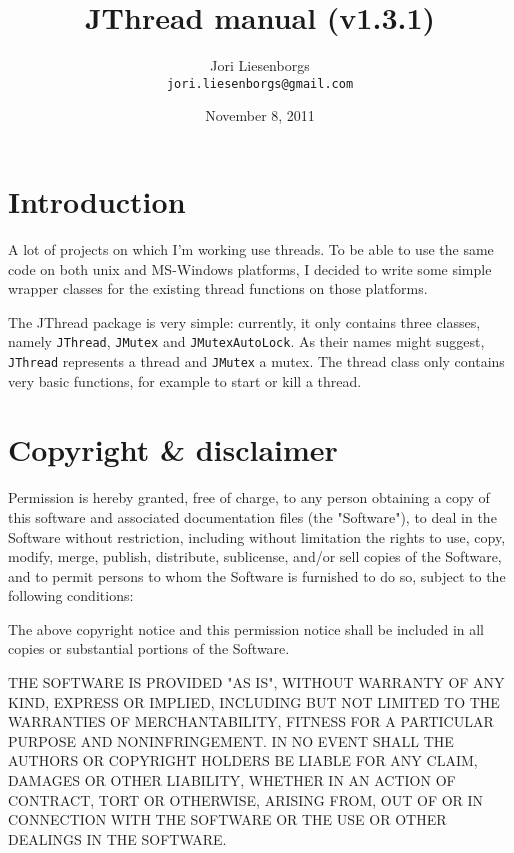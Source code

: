 \documentclass[a4paper,12pt]{article}
\begin{document}
	\title{JThread manual (v1.3.1)}
	\author{Jori Liesenborgs\\
	        {\tt jori.liesenborgs@gmail.com} }
	\date{November 8, 2011}
	\maketitle

	\section{Introduction}

	A lot of projects on which I'm working use threads. To be able to
	use the same code on both unix and MS-Windows platforms, I decided
	to write some simple wrapper classes for the existing thread functions
	on those platforms.

	The JThread package is very simple: currently, it only contains three
	classes, namely {\tt JThread}, {\tt JMutex} and {\tt JMutexAutoLock}. 
	As their names might
	suggest, {\tt JThread} represents a thread and {\tt JMutex} a mutex.
	The thread class only contains very basic functions, for example to
	start or kill a thread.

	\section{Copyright \& disclaimer}

	Permission is hereby granted, free of charge, to any person obtaining a
	copy of this software and associated documentation files (the "Software"),
	to deal in the Software without restriction, including without limitation
	the rights to use, copy, modify, merge, publish, distribute, sublicense,
	and/or sell copies of the Software, and to permit persons to whom the
	Software is furnished to do so, subject to the following conditions:

	The above copyright notice and this permission notice shall be included
	in all copies or substantial portions of the Software.

	THE SOFTWARE IS PROVIDED "AS IS", WITHOUT WARRANTY OF ANY KIND, EXPRESS
	OR IMPLIED, INCLUDING BUT NOT LIMITED TO THE WARRANTIES OF MERCHANTABILITY,
	FITNESS FOR A PARTICULAR PURPOSE AND NONINFRINGEMENT.  IN NO EVENT SHALL
	THE AUTHORS OR COPYRIGHT HOLDERS BE LIABLE FOR ANY CLAIM, DAMAGES OR OTHER
	LIABILITY, WHETHER IN AN ACTION OF CONTRACT, TORT OR OTHERWISE, ARISING
	FROM, OUT OF OR IN CONNECTION WITH THE SOFTWARE OR THE USE OR OTHER DEALINGS
	IN THE SOFTWARE.
\end{document}
